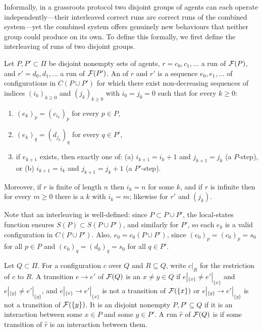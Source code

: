 Informally, in a grassroots protocol two disjoint groups of agents can each operate independently---their interleaved correct runs are correct runs of the combined system---yet the combined system offers genuinely new behaviours that neither group could produce on its own. To define this formally, we first define the interleaving of runs of two disjoint groups.

\begin{definition}\label{def:interleaving}
Let $P, P' \subset \Pi$ be disjoint nonempty sets of agents, $r = c_0, c_1, \ldots$ a run of $\mathcal{F}(P)$, and $r' = d_0, d_1, \ldots$ a run of $\mathcal{F}(P')$. An  of $r$ and $r'$ is a sequence $e_0, e_1, \ldots$ of configurations in $C(P \cup P')$ for which there exist non-decreasing sequences of indices $(i_k)_{k \geq 0}$ and $(j_k)_{k \geq 0}$ with $i_0 = j_0 = 0$ such that for every $k \geq 0$:
\begin{enumerate}
\item $(e_k)_p = (c_{i_k})_p$ for every $p \in P$,
\item $(e_k)_q = (d_{j_k})_q$ for every $q \in P'$,
\item if $e_{k+1}$ exists, then exactly one of:
  (a) $i_{k+1} = i_k + 1$ and $j_{k+1} = j_k$ (a $P$-step), or
  (b) $i_{k+1} = i_k$ and $j_{k+1} = j_k + 1$ (a $P'$-step).
\end{enumerate}
Moreover, if $r$ is finite of length $n$ then $i_k = n$ for some $k$, and if $r$ is infinite then for every $m \ge 0$ there is a $k$ with $i_k = m$; likewise for $r'$ and $(j_k)$.
\end{definition}

Note that an interleaving is well-defined: since $P \subset P \cup P'$, the local-states function ensures $S(P) \subset S(P \cup P')$, and similarly for $P'$, so each $e_k$ is a valid configuration in $C(P \cup P')$. Also, $e_0 = c_0(P \cup P')$, since $(e_0)_p = (c_0)_p = s_0$ for all $p \in P$ and $(e_0)_q = (d_0)_q = s_0$ for all $q \in P'$.

\begin{definition}\label{definition:interaction}
Let $Q \subset \Pi$. For a configuration $c$ over $Q$ and $R \subseteq Q$, write $c|_R$ for the restriction of $c$ to $R$. A transition $e \to e'$ of $\mathcal{F}(Q)$ is an  $x \ne y \in Q$ if $e|_{\{x\}} \ne e'|_{\{x\}}$ and $e|_{\{y\}} \ne e'|_{\{y\}}$, and $e|_{\{x\}} \to e'|_{\{x\}}$ is not a transition of $\mathcal{F}(\{x\})$ or $e|_{\{y\}} \to e'|_{\{y\}}$ is not a transition of $\mathcal{F}(\{y\})$. It is an  disjoint nonempty $P, P' \subseteq Q$ if it is an interaction between some $x \in P$ and some $y \in P'$. A run $\hat r$ of $\mathcal{F}(Q)$ is  if some transition of $\hat r$ is an interaction between them.
\end{definition}

